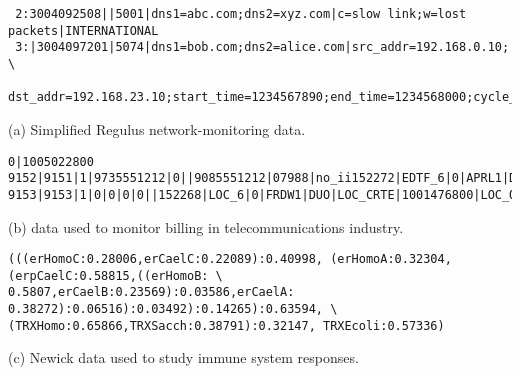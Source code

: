 \begin{figure*}
  \centering
  \small

\begin{verbatim}
 2:3004092508||5001|dns1=abc.com;dns2=xyz.com|c=slow link;w=lost packets|INTERNATIONAL
 3:|3004097201|5074|dns1=bob.com;dns2=alice.com|src_addr=192.168.0.10; \
 dst_addr=192.168.23.10;start_time=1234567890;end_time=1234568000;cycle_time=17412|SPECIAL
\end{verbatim}  
(a) Simplified Regulus network-monitoring data. 

\begin{verbatim}
0|1005022800
9152|9151|1|9735551212|0||9085551212|07988|no_ii152272|EDTF_6|0|APRL1|DUO|10|1000295291
9153|9153|1|0|0|0|0||152268|LOC_6|0|FRDW1|DUO|LOC_CRTE|1001476800|LOC_OS_10|1001649601
\end{verbatim}
(b) \dibbler{} data used to monitor billing in telecommunications industry.

\begin{verbatim}
(((erHomoC:0.28006,erCaelC:0.22089):0.40998, (erHomoA:0.32304,(erpCaelC:0.58815,((erHomoB: \
0.5807,erCaelB:0.23569):0.03586,erCaelA: 0.38272):0.06516):0.03492):0.14265):0.63594, \
(TRXHomo:0.65866,TRXSacch:0.38791):0.32147, TRXEcoli:0.57336)
\end{verbatim}
(c) Newick data used to study immune system responses. 


  \caption{Snippets of a variety of ad hoc data formats. Each `$\backslash$' denotes a newline we inserted to improve readability. }
  \label{fig:sample-data}
\end{figure*}



